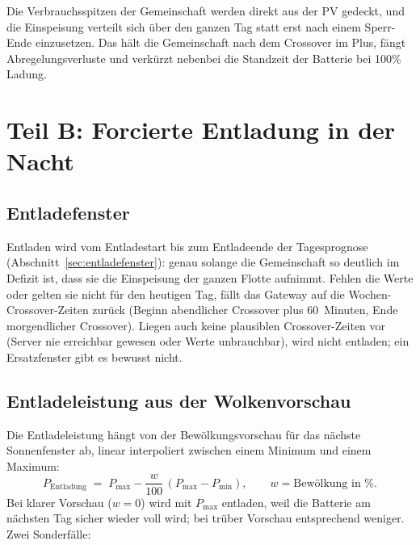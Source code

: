 \documentclass[11pt,a4paper]{article}
\begin{document}
Die Verbrauchsspitzen der Gemeinschaft werden direkt aus der PV gedeckt,
und die Einspeisung verteilt sich über den ganzen Tag statt erst nach einem
Sperr-Ende einzusetzen. Das hält die Gemeinschaft nach dem Crossover im
Plus, fängt Abregelungsverluste und verkürzt nebenbei die Standzeit der
Batterie bei 100\% Ladung.

\section{Teil B: Forcierte Entladung in der Nacht}\label{sec:entladung}

\subsection{Entladefenster}

Entladen wird vom Entladestart bis zum Entladeende der Tagesprognose
(Abschnitt~\ref{sec:entladefenster}): genau solange die Gemeinschaft so
deutlich im Defizit ist, dass sie die Einspeisung der ganzen Flotte
aufnimmt. Fehlen die Werte oder gelten sie nicht für den heutigen Tag, fällt
das Gateway auf die Wochen-Crossover-Zeiten zurück (Beginn abendlicher
Crossover plus 60~Minuten, Ende morgendlicher Crossover). Liegen auch keine
plausiblen Crossover-Zeiten vor (Server nie erreichbar gewesen oder Werte
unbrauchbar), wird nicht entladen; ein Ersatzfenster gibt es bewusst
nicht.

\subsection{Entladeleistung aus der Wolkenvorschau}

Die Entladeleistung hängt von der Bewölkungsvorschau für das nächste
Sonnenfenster ab, linear interpoliert zwischen einem Minimum und einem
Maximum:
\begin{equation}
  P_{\text{Entladung}} \;=\; P_{\max} - \frac{w}{100}\,(P_{\max} - P_{\min}),
  \qquad w = \text{Bewölkung in \%}.
  \label{eq:power}
\end{equation}
Bei klarer Vorschau ($w=0$) wird mit $P_{\max}$ entladen, weil die Batterie
am nächsten Tag sicher wieder voll wird; bei trüber Vorschau entsprechend
weniger. Zwei Sonderfälle:
\end{document}
